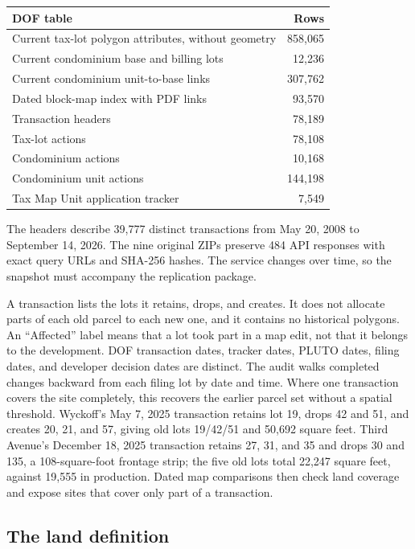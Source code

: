\begin{center}
\small
\begin{tabular}{lr}
\hline
DOF table & Rows \\
\hline
Current tax-lot polygon attributes, without geometry & 858,065 \\
Current condominium base and billing lots & 12,236 \\
Current condominium unit-to-base links & 307,762 \\
Dated block-map index with PDF links & 93,570 \\
Transaction headers & 78,189 \\
Tax-lot actions & 78,108 \\
Condominium actions & 10,168 \\
Condominium unit actions & 144,198 \\
Tax Map Unit application tracker & 7,549 \\
\hline
\end{tabular}
\end{center}

The headers describe 39,777 distinct transactions from May 20, 2008 to
September 14, 2026. The nine original ZIPs preserve 484 API responses with
exact query URLs and SHA-256 hashes. The service changes over time, so the
snapshot must accompany the replication package.

A transaction lists the lots it retains, drops, and creates. It does not
allocate parts of each old parcel to each new one, and it contains no
historical polygons. An ``Affected'' label means that a lot took part in a map
edit, not that it belongs to the development. DOF transaction dates, tracker
dates, PLUTO dates, filing dates, and developer decision dates are distinct.
The audit walks completed changes backward from each filing lot by date and
time. Where one transaction covers the site completely, this recovers the
earlier parcel set without a spatial threshold. Wyckoff's May 7, 2025
transaction retains lot 19, drops 42 and 51, and creates 20, 21, and 57, giving
old lots 19/42/51 and 50,692 square feet. Third Avenue's December 18, 2025
transaction retains 27, 31, and 35 and drops 30 and 135, a 108-square-foot
frontage strip; the five old lots total 22,247 square feet, against 19,555 in
production. Dated map comparisons then check land coverage and expose sites
that cover only part of a transaction.

\subsection*{The land definition}

